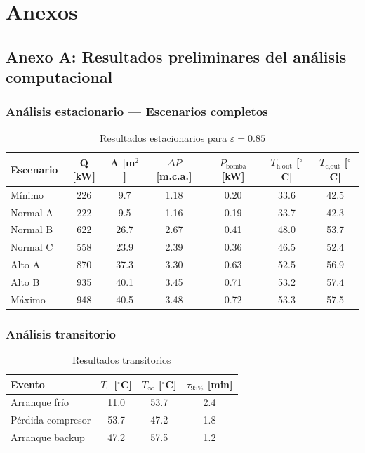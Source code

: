 \documentclass[11pt,a4paper]{article}
\begin{document}
\section{Anexos}

\subsection{Anexo A: Resultados preliminares del análisis computacional}

\subsubsection{Análisis estacionario — Escenarios completos}

\begin{table}[H]
\centering
\caption{Resultados estacionarios para $\varepsilon = 0.85$}
\begin{tabular}{@{}lcccccc@{}}
\toprule
\textbf{Escenario} & \textbf{Q [kW]} & \textbf{A [m$^2$]} & \textbf{$\Delta P$ [m.c.a.]} & \textbf{$P_{\text{bomba}}$ [kW]} & \textbf{$T_{\text{h,out}}$ [$^\circ$C]} & \textbf{$T_{\text{c,out}}$ [$^\circ$C]} \\
\midrule
Mínimo & 226 & 9.7 & 1.18 & 0.20 & 33.6 & 42.5 \\
Normal A & 222 & 9.5 & 1.16 & 0.19 & 33.7 & 42.3 \\
Normal B & 622 & 26.7 & 2.67 & 0.41 & 48.0 & 53.7 \\
Normal C & 558 & 23.9 & 2.39 & 0.36 & 46.5 & 52.4 \\
Alto A & 870 & 37.3 & 3.30 & 0.63 & 52.5 & 56.9 \\
Alto B & 935 & 40.1 & 3.45 & 0.71 & 53.2 & 57.4 \\
Máximo & 948 & 40.5 & 3.48 & 0.72 & 53.3 & 57.5 \\
\bottomrule
\end{tabular}
\end{table}

\subsubsection{Análisis transitorio}

\begin{table}[H]
\centering
\caption{Resultados transitorios}
\begin{tabular}{@{}lccc@{}}
\toprule
\textbf{Evento} & \textbf{$T_0$ [$^\circ$C]} & \textbf{$T_\infty$ [$^\circ$C]} & \textbf{$\tau_{95\%}$ [min]} \\
\midrule
Arranque frío & 11.0 & 53.7 & 2.4 \\
Pérdida compresor & 53.7 & 47.2 & 1.8 \\
Arranque backup & 47.2 & 57.5 & 1.2 \\
\bottomrule
\end{tabular}
\end{table}
\end{document}
